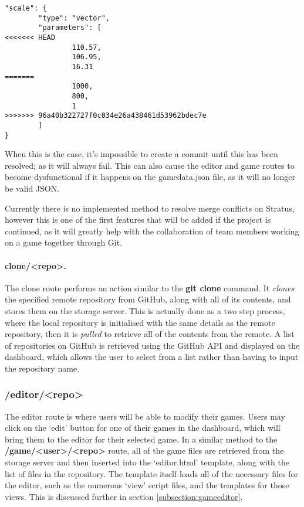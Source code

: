 	\begin{lstlisting}
"scale": {
        "type": "vector",
        "parameters": [
<<<<<<< HEAD
                110.57,
                106.95,
                16.31
=======
                1000,
                800,
                1
>>>>>>> 96a40b322727f0c034e26a438461d53962bdec7e
        ]
}\end{lstlisting}

	When this is the case, it's impossible to create a commit until this has been resolved; as it will always fail. This can also cause the editor and game routes to become dysfunctional if it happens on the gamedata.json file, as it will no longer be valid JSON.

	Currently there is no implemented method to resolve merge conflicts on Stratus, however this is one of the first features that will be added if the project is continued, as it will greatly help with the collaboration of team members working on a game together through Git.

	\paragraph{clone/<repo>.}
	The clone route performs an action similar to the \textbf{git clone} command. It \emph{clones} the specified remote repository from GitHub, along with all of its contents, and stores them on the storage server. This is actually done as a two step process, where the local repository is initialised with the same details as the remote repository, then it is \emph{pulled} to retrieve all of the contents from the remote. A list of repositories on GitHub is retrieved using the GitHub API and displayed on the dashboard, which allows the user to select from a list rather than having to input the repository name.
	
	\subsubsection{/editor/<repo>}
	The editor route is where users will be able to modify their games. Users may click on the `edit' button for one of their games in the dashboard, which will bring them to the editor for their selected game. In a similar method to the \textbf{/game/<user>/<repo>} route, all of the game files are retrieved from the storage server and then inserted into the `editor.html' template, along with the list of files in the repository. The template itself loads all of the necessary files for the editor, such as the numerous `view' script files, and the templates for those views. This is discussed further in section \ref{subsection:gameeditor}.

